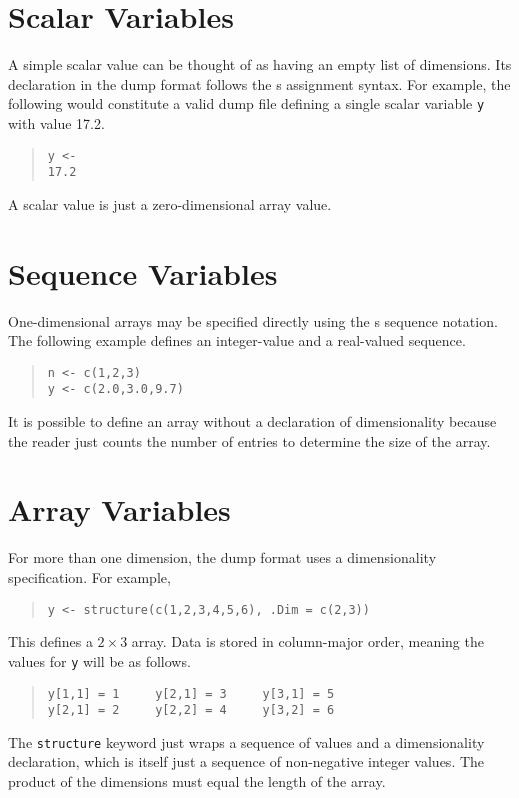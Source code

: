 \documentclass[10pt]{report}
\newcommand{\acronym}[1]{{\sc #1}\xspace}
\newcommand{\SPLUS}{\acronym{s}}
\newcommand{\code}[1]{{\tt #1}}
\begin{document}
\section{Scalar Variables}

A simple scalar value can be thought of as having an empty list of
dimensions.  Its declaration in the dump format follows the \SPLUS
assignment syntax.  For example, the following would constitute a
valid dump file defining a single scalar variable \code{y} with value
17.2.
%
\begin{quote}
\begin{Verbatim}
y <- 
17.2
\end{Verbatim}
\end{quote}
%
A scalar value is just a zero-dimensional array value.

\section{Sequence Variables}

One-dimensional arrays may be specified directly using the \SPLUS
sequence notation.  The following example defines an integer-value and
a real-valued sequence.
%
\begin{quote}
\begin{Verbatim}
n <- c(1,2,3)
y <- c(2.0,3.0,9.7)
\end{Verbatim}
\end{quote}
%
It is possible to define an array without a declaration of
dimensionality because the reader just counts the number of entries to
determine the size of the array.

\section{Array Variables}

For more than one dimension, the dump format uses a dimensionality
specification.  For example,
%
\begin{quote}
\begin{verbatim}
y <- structure(c(1,2,3,4,5,6), .Dim = c(2,3))
\end{verbatim}
\end{quote}
%
This defines a $2 \times 3$ array.  Data is stored in column-major
order, meaning the values for \code{y} will be as follows.
%
\begin{quote}
\begin{Verbatim}
y[1,1] = 1     y[2,1] = 3     y[3,1] = 5    
y[2,1] = 2     y[2,2] = 4     y[3,2] = 6
\end{Verbatim}
\end{quote}
%
The \code{structure} keyword just wraps a sequence of values and a
dimensionality declaration, which is itself just a sequence of
non-negative integer values.  The product of the dimensions must equal
the length of the array.
\end{document}

